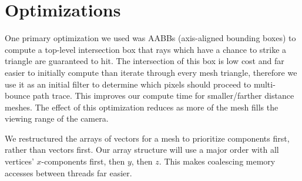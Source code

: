 \documentclass[../main.tex]{subfiles}
\begin{document}
\section{Optimizations}

One primary optimization we used was AABBs (axis-aligned bounding boxes) to
compute a top-level intersection box that rays which have a chance to strike a
triangle are guaranteed to hit. The intersection of this box is low cost and
far easier to initially compute than iterate through every mesh triangle,
therefore we use it as an initial filter to determine which pixels should
proceed to multi-bounce path trace. This improves our compute time for
smaller/farther distance meshes. The effect of this optimization reduces as
more of the mesh fills the viewing range of the camera.

We restructured the arrays of vectors for a mesh to prioritize components first, rather
than vectors first. Our array structure will use a major order with all vertices' \(x\)-components
first, then \(y\), then \(z\). This makes coalescing memory accesses between threads far easier.

\ifSubfilesClassLoaded{%
    \nocite{*}
    \twocolumn
}{}
\end{document}
